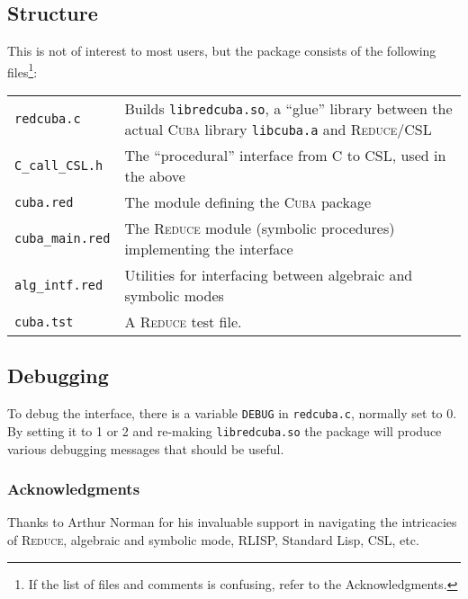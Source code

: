 \documentclass[11pt]{article}
\newcommand{\Reduce}{\textsc{Reduce}}
\newcommand{\Cuba}{\textsc{Cuba}}
\begin{document}
\subsection{Structure}

This is not of interest to most users, but the package consists of the following
files\footnote{If the list of files and comments is confusing, refer to the
  Acknowledgments.}:
\begin{table*}[h]
  \centering
  \begin{tabular}{|l|p{}|} \hline
    \texttt{redcuba.c} & Builds \texttt{libredcuba.so}, a ``glue'' library
    between the actual {\Cuba} library \texttt{libcuba.a} and {\Reduce}/CSL \\
    \texttt{C\_call\_CSL.h} &  The ``procedural'' interface from C to CSL, used
    in the above \\ \hline
    \texttt{cuba.red}       & The module defining the {\Cuba} package \\
    \texttt{cuba\_main.red} &  The {\Reduce} module (symbolic procedures) implementing
    the interface \\ 
    \texttt{alg\_intf.red}  & Utilities for interfacing between algebraic and
     symbolic modes \\
    \texttt{cuba.tst} & A {\Reduce} test file. \\
    \hline
  \end{tabular}
\end{table*}

\subsection{Debugging}

To debug the interface, there is a variable \texttt{DEBUG} in
\texttt{redcuba.c}, normally set to 0.  By setting it to 1 or 2 and re-making
\texttt{libredcuba.so} the package will produce various debugging messages that
should be useful.



\subsubsection*{Acknowledgments}
Thanks to Arthur Norman for his invaluable support in navigating the intricacies
of {\Reduce}, algebraic and symbolic mode, RLISP, Standard Lisp, CSL, etc.
\end{document}
